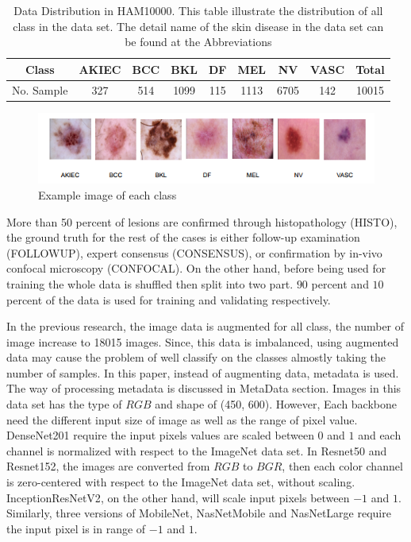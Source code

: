 \documentclass[sensors,article,submit,pdftex,moreauthors]{Definitions/mdpi}
\begin{document}
\begin{table}[H]
	\centering
	\begin{tabular}{|c c c c c c c c c|} 
		\hline
		Class & AKIEC & BCC & BKL & DF & MEL & NV & VASC & Total \\ 
		\hline
		No. Sample & 327 & 514 & 1099 & 115 & 1113 & 6705 & 142 & 10015 \\
		\hline
	\end{tabular}
	\caption{Data Distribution in HAM10000. This table illustrate the distribution of all class in the data set. The detail name of the skin disease in the data set can be found at the Abbreviations}
	\label{table:data-distribution}
\end{table}

\begin{figure}[H]
	\centering
	\includegraphics[width=1\linewidth]{Definitions/DataDistribution}
	\caption{Example image of each class}
	\label{fig:data-sample}
\end{figure}

More than 50 percent of lesions are confirmed through histopathology (HISTO), the ground truth for the rest of the cases is either follow-up examination (FOLLOWUP), expert consensus (CONSENSUS), or confirmation by in-vivo confocal microscopy (CONFOCAL). On the other hand, before being used for training the whole data is shuffled then split into two part. $90$ percent and $10$ percent of the data is used for training and validating respectively.

In the previous research\cite{03358}, the image data is augmented for all class, the number of image increase to 18015 images. Since, this data is imbalanced, using augmented data may cause the problem of well classify on the classes almostly taking the number of samples. In this paper, instead of augmenting data, metadata is used. The way of processing metadata is discussed in MetaData section. Images in this data set has the type of $RGB$ and shape of (450, 600). However, Each backbone need the different input size of image as well as the range of pixel value. DenseNet201\cite{06993} require the input pixels values are scaled between $0$ and $1$ and each channel is normalized with respect to the ImageNet data set. In Resnet50 and Resnet152\cite{03385}\cite{05027}, the images are converted from $RGB$ to $BGR$, then each color channel is zero-centered with respect to the ImageNet data set, without scaling. InceptionResNetV2\cite{11946}, on the other hand, will scale input pixels between $-1$ and $1$. Similarly, three versions of MobileNet\cite{04861}\cite{04381}\cite{02244}, NasNetMobile and NasNetLarge\cite{07012} require the input pixel is in range of $-1$ and $1$. 
\end{document}
